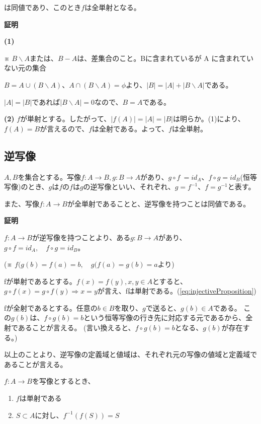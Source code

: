 \documentclass[dvipdfmx,autodetect-engine]{jsarticle}
\begin{document}
は同値であり、このとき$f$は全単射となる。

{\bf 証明}

{\bf (1)}

※ $B \backslash A$または、$B-A$は、差集合のこと。Bに含まれているが A に含まれていない元の集合

$B = A \cup (B \backslash A)$、$A \cap (B \backslash A) = \phi$より、$ |B| = |A| + |B\backslash A|$である。

$|A| = |B|$であれば$|B \backslash A| = 0$なので、$B = A$である。

{\bf (2)}
$f$が単射とする。したがって、$|f(A)| = |A| = |B|$は明らか。(1)により、$f(A) = B$が言えるので、$f$は全射である。よって、$f$は全単射。

\subsection{逆写像}

$A, B$を集合とする。写像$f: A \to B, g: B \to A$があり、$g \circ f\ = id_{A}、f \circ g = id_{B}$(恒等写像)のとき、$g$は$f$の$f$は$g$の逆写像といい、それぞれ、$g = f^{-1}$、$f = g^{-1}$と表す。

また、写像$f:A \to B$が全単射であることと、逆写像を持つことは同値である。

{ \bf 証明 }

$f: A \to B$が逆写像を持つことより、ある$g: B \to A$があり、$g \circ f = id_{A}, \quad f \circ g = id_{B}$。

(※ $f(g(b) = f(a) = b, \quad g(f(a) = g(b) = a$より)

fが単射であるとする。$f(x) = f(y), x,y \in A$とすると、$g \circ f(x) = g \circ f(y) \Rightarrow x = y$が言え、fは単射である。(\ref{eq:injectiveProposition})

fが全射であるとする。任意の$b \in B$を取り、$g$で送ると、$g(b) \in A$である。
この$g(b)$は、$f \circ g(b) = b$という恒等写像の行き先に対応する元であるから、全射であることが言える。
(言い換えると、$f \circ g(b) = b$となる、$g(b)$が存在する。)

\prop

以上のことより、逆写像の定義域と値域は、それぞれ元の写像の値域と定義域であることが言える。

\exercise

$f:A \to B$を写像とするとき、

\begin{enumerate}
\renewcommand{\labelenumi}{(\arabic{enumi})}
	\item $f$は単射である
	\item $S \subset A$に対し、$f^{-1}(f(S)) = S$
\end{enumerate}
\end{document}
